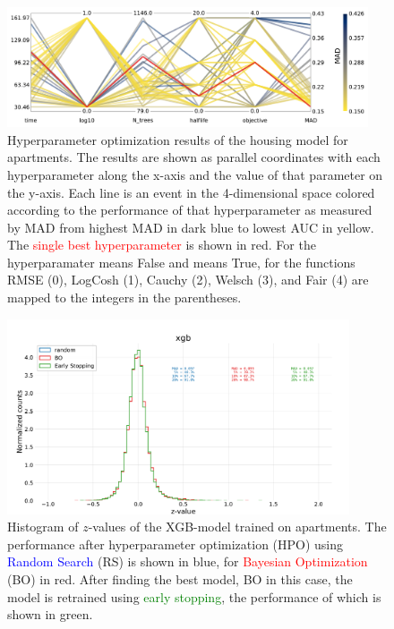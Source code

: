 \documentclass[a4paper, twoside, nobib]{tufte-book}
\newcommand{\code}[1]{\colorbox{light-gray}{\texttt{\detokenize{#1}}}}
\begin{document}
\newpage


\begin{figure}
  \includegraphics[width=0.95\textwidth, trim=0 0 0 0, clip]{figures/housing/Ejerlejlighed_v18_cut_all_Ncols_all_CV_viz_initial_HPO.pdf}
  \caption[Overview of initial hyperparamater optimization of the housing model for apartments]
          {Hyperparameter optimization results of the housing model for apartments. The results are shown as parallel coordinates with each hyperparameter along the x-axis and the value of that parameter on the y-axis. Each line is an event in the 4-dimensional space colored according to the performance of that hyperparameter as measured by MAD from \textcolor{viridis-dark}{highest} MAD in dark blue to \textcolor{viridis-light}{lowest} AUC in yellow. The \textcolor{red}{single best hyperparameter} is shown in red. For the hyperparamater \code{log10} \code{0} means False and \code{1} means True, for \code{objektive} the functions RMSE (0), LogCosh (1), Cauchy (2), Welsch (3), and Fair (4) are mapped to the integers in the parentheses.   
          } 
  \label{fig:h:CV_res_parallel_coords}
\end{figure}



\begin{figure}
  \includegraphics[width=0.9\textwidth, trim=0 0 0 70, clip]{figures/housing/Ejerlejlighed_v18_cut_all_Ncols_all_xgb_z_hist_metrics.pdf}
  \caption[Performance of XGB-model on apartment prices]
          {Histogram of $z$-values of the XGB-model trained on apartments. The performance after hyperparameter optimization (HPO) using \textcolor{blue}{Random Search} (RS) is shown in blue, for \textcolor{red}{Bayesian Optimization} (BO) in red. After finding the best model, BO in this case, the model is retrained using \textcolor{green}{early stopping}, the performance of which is shown in green.}
  \label{fig:h:performance_xgb}
\end{figure}
\end{document}
